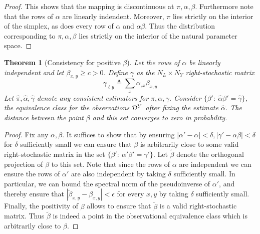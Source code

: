 \documentclass{article}
\newtheorem*{thm*}{Theorem}
\theoremstyle{definition}
\begin{document}
\begin{proof}
    This shows that the mapping is discontinuous at $\pi,\alpha,\beta$.  Furthermore note that the rows of $\alpha$ are linearly indendent.  Moreover, $\pi$ lies strictly on the interior of the simplex, as does every row of $\alpha$ and $\alpha\beta$.  Thus the distribution corresponding to $\pi,\alpha,\beta$ lies strictly on the interior of the natural parameter space.
\end{proof}

\begin{thm*}[Consistency for positive $\beta$]  Let the rows of $\alpha$ be linearly independent and let $\beta_{x,y}\geq c>0$.  Define $\gamma$ as the $N_L\times N_Y$ right-stochastic matrix
\[
\gamma_{\ell y} \triangleq \sum_{x} \alpha_{_\ell x} \beta_{x,y}
\]
Let $\hat \pi, \hat \alpha, \hat \gamma$ denote any consistent estimators for $\pi,\alpha,\gamma$.  Consider $\{\beta':\ \hat \alpha\beta'=\hat \gamma \}$, the equivalence class for the observations $\mathcal{D}^Y$ after fixing the estimate $\hat \alpha$.  The distance between the point $\beta$ and this set converges to zero in probability.  
\end{thm*}

\begin{proof}
Fix any $\alpha,\beta$.  It suffices to show that by ensuring $\left|\alpha'-\alpha\right|<\delta,\left|\gamma'-\alpha \beta\right|<\delta$ for $\delta$ sufficiently small we can ensure that $\beta$ is arbitrarily close to some valid right-stochastic matrix in the set $\{\beta':\ \alpha'\beta' = \gamma'\}$.  Let $\tilde{\beta}$ denote the orthogonal projection of $\beta$ to this set.  Note that since the rows of $\alpha$ are independent we can ensure the rows of $\alpha'$ are also independent by taking $\delta$ sufficiently small.  In particular, we can bound the spectral norm of the pseudoinverse of $\alpha'$, and thereby ensure that $\left|\tilde{\beta}_{x,y}-\beta_{x,y}\right|<\epsilon$ for every $x,y$ by taking $\delta$ sufficiently small. Finally, the positivity of $\beta$ allows to ensure that $\tilde \beta$ is a valid right-stochastic matrix.  Thus $\tilde \beta$ is indeed a point in the observational equivalence class which is arbitrarily close to $\beta$.  
\end{proof}
\end{document}
